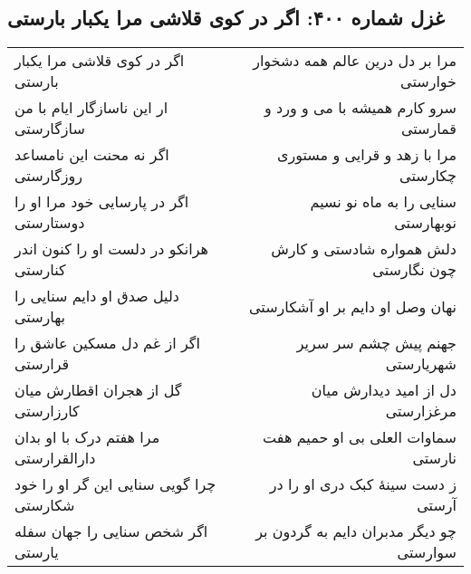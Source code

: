 \begin{center}
\section*{غزل شماره ۴۰۰: اگر در کوی قلاشی مرا یکبار بارستی}
\label{sec:400}
\begin{longtable}{l p{0.5cm} r}
اگر در کوی قلاشی مرا یکبار بارستی
&&
مرا بر دل درین عالم همه دشخوار خوارستی
\\
ار این ناسازگار ایام با من سازگارستی
&&
سرو کارم همیشه با می و ورد و قمارستی
\\
اگر نه محنت این نامساعد روزگارستی
&&
مرا با زهد و قرایی و مستوری چکارستی
\\
اگر در پارسایی خود مرا او را دوستارستی
&&
سنایی را به ماه نو نسیم نوبهارستی
\\
هرانکو در دلست او را کنون اندر کنارستی
&&
دلش همواره شادستی و کارش چون نگارستی
\\
دلیل صدق او دایم سنایی را بهارستی
&&
نهان وصل او دایم بر او آشکارستی
\\
اگر از غم دل مسکین عاشق را قرارستی
&&
جهنم پیش چشم سر سریر شهریارستی
\\
گل از هجران اقطارش میان کارزارستی
&&
دل از امید دیدارش میان مرغزارستی
\\
مرا هفتم درک با او بدان دارالقرارستی
&&
سماوات العلی بی او حمیم هفت نارستی
\\
چرا گویی سنایی این گر او را خود شکارستی
&&
ز دست سینهٔ کبک دری او را در آرستی
\\
اگر شخص سنایی را جهان سفله یارستی
&&
چو دیگر مدبران دایم به گردون بر سوارستی
\\
\end{longtable}
\end{center}
